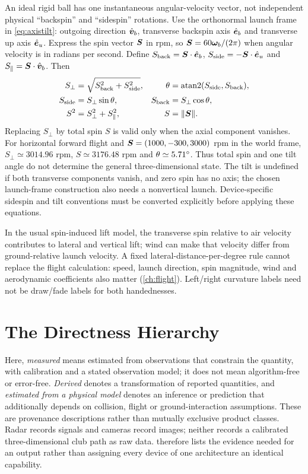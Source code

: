 An ideal rigid ball has one instantaneous angular-velocity vector, not independent physical ``backspin'' and ``sidespin'' rotations.
Use the orthonormal launch frame in \cref{eq:axistilt}: outgoing direction $\hat{\bm{v}}_b$, transverse backspin axis $\hat{\bm{e}}_b$ and transverse up axis $\hat{\bm{e}}_u$.
Express the spin vector $\bm{S}$ in rpm, so $\bm{S}=60\boldsymbol\omega_b/(2\pi)$ when angular velocity is in radians per second.
Define $S_{\rm back}=\bm{S}\cdot\hat{\bm{e}}_b$, $S_{\rm side}=-\bm{S}\cdot\hat{\bm{e}}_u$ and $S_{\parallel}=\bm{S}\cdot\hat{\bm{v}}_b$.
Then
\begin{equation}
\label{eq:spincomponents}
\begin{aligned}
 S_\perp&=\sqrt{S_{\rm back}^2+S_{\rm side}^2},&
 \theta&=\operatorname{atan2}(S_{\rm side},S_{\rm back}),\\
 S_{\rm side}&=S_\perp\sin\theta,&
 S_{\rm back}&=S_\perp\cos\theta,\\
 S^2&=S_\perp^2+S_\parallel^2,& S&=\|\bm{S}\|.
\end{aligned}
\end{equation}
Replacing $S_\perp$ by total spin $S$ is valid only when the axial component vanishes.
For horizontal forward flight and $\bm{S}=(1000,-300,3000)$ rpm in the world frame, $S_\perp\simeq3014.96$ rpm, $S\simeq3176.48$ rpm and $\theta\simeq5.71\si{\degree}$.
Thus total spin and one tilt angle do not determine the general three-dimensional state.
The tilt is undefined if both transverse components vanish, and zero spin has no axis; the chosen launch-frame construction also needs a nonvertical launch.
Device-specific sidespin and tilt conventions must be converted explicitly before applying these equations.

In the usual spin-induced lift model, the transverse spin relative to air velocity contributes to lateral and vertical lift; wind can make that velocity differ from ground-relative launch velocity.
A fixed lateral-distance-per-degree rule cannot replace the flight calculation: speed, launch direction, spin magnitude, wind and aerodynamic coefficients also matter (\cref{ch:flight}).
Left/right curvature labels need not be draw/fade labels for both handednesses.

\section{The Directness Hierarchy}
\label{sec:hierarchy}

Here, \emph{measured} means estimated from observations that constrain the quantity, with calibration and a stated observation model; it does not mean algorithm-free or error-free.
\emph{Derived} denotes a transformation of reported quantities, and \emph{estimated from a physical model} denotes an inference or prediction that additionally depends on collision, flight or ground-interaction assumptions.
These are provenance descriptions rather than mutually exclusive product classes.
Radar records signals and cameras record images; neither records a calibrated three-dimensional club path as raw data.
 therefore lists the evidence needed for an output rather than assigning every device of one architecture an identical capability.

